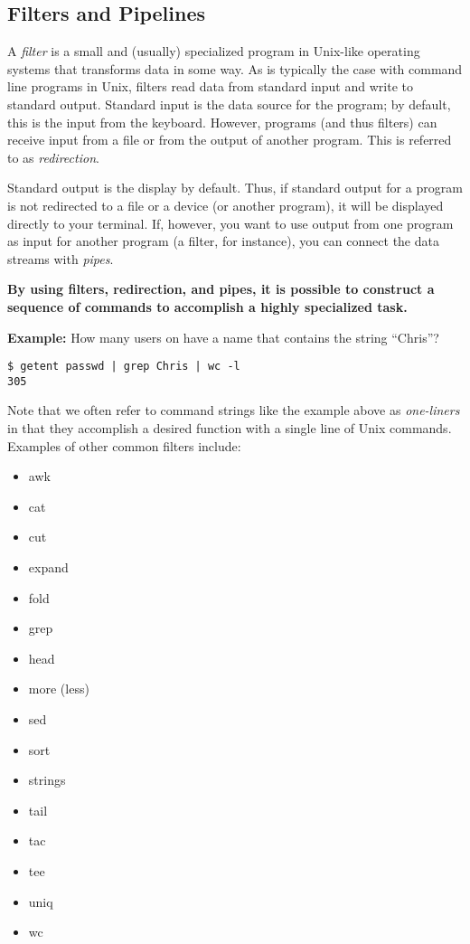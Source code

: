 \documentclass[letterpaper,12pt]{article}
\begin{document}
{\newpage
\subsection*{Filters and Pipelines}

A \textit{filter} is a small and (usually) specialized program in Unix-like
operating systems that transforms data in some way.  As is typically the case
with command line programs in Unix, filters read data from standard input and
write to standard output.  Standard input is the data source for the program;
by default, this is the input from the keyboard. However, programs (and thus
filters) can receive input from a file or from the output of another
program. This is referred to as \textit{redirection}.

Standard output is the display by default. Thus, if standard output
for a program is not redirected to a file or a device (or another
program), it will be displayed directly to your terminal. If, however,
you want to use output from one program as input for another program
(a filter, for instance), you can connect the data streams with
\textit{pipes}.

\smallskip

\noindent \textbf{By using filters, redirection, and pipes, it is possible to
  construct a sequence of commands to accomplish a highly specialized
  task.}

\bigskip

\noindent \textbf{Example:} How many users on \system{} have a name that contains the string ``Chris''?

\begin{verbatim}
$ getent passwd | grep Chris | wc -l
305
\end{verbatim}

Note that we often refer to command strings like the example above as
{\em one-liners} in that they accomplish a desired function with a
single line of Unix commands.   \\

\noindent Examples of other common filters include:

\begin{multicols}{3}
\begin{itemize}[nolistsep]
    \item awk
    \item cat
    \item cut
    \item expand
    \item fold
    \item grep
    \item head
    \item more (less)
    \item sed 
    \item sort
    \item strings
    \item tail
    \item tac
    \item tee
    \item uniq
    \item wc
\end{itemize}
\end{multicols}

}
\end{document}
